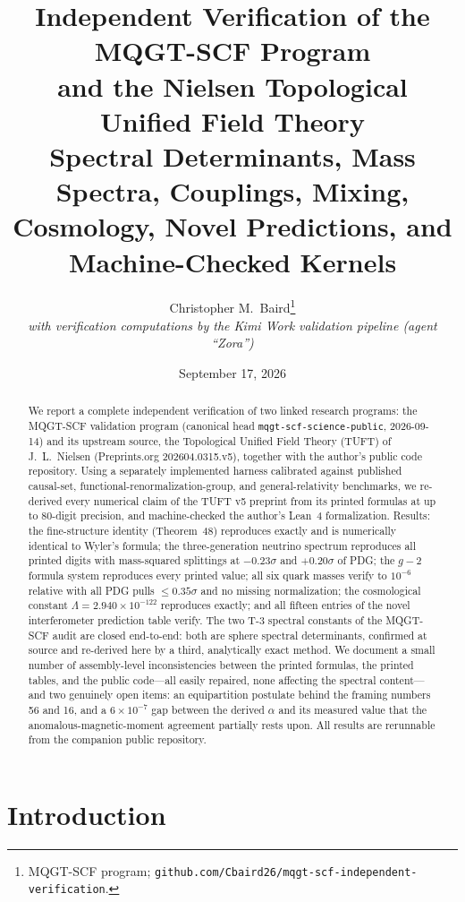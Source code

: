 \documentclass[11pt,letterpaper]{article}
\title{\textbf{Independent Verification of the MQGT-SCF Program\\
and the Nielsen Topological Unified Field Theory}\\[6pt]
\large Spectral Determinants, Mass Spectra, Couplings, Mixing,\\
Cosmology, Novel Predictions, and Machine-Checked Kernels}
\author{Christopher M.\ Baird\thanks{MQGT-SCF program;
\texttt{github.com/Cbaird26/mqgt-scf-independent-verification}.}\\
\textit{with verification computations by the Kimi Work validation pipeline (agent ``Zora'')}
}
\date{September 17, 2026}
\begin{document}
\maketitle

\begin{abstract}
\noindent We report a complete independent verification of two linked
research programs: the MQGT-SCF validation program (canonical head
\texttt{mqgt-scf-science-public}, 2026-09-14) and its upstream source, the
Topological Unified Field Theory (TUFT) of J.~L.~Nielsen
(Preprints.org 202604.0315.v5), together with the author's public code
repository. Using a separately implemented harness calibrated against
published causal-set, functional-renormalization-group, and general-relativity
benchmarks, we re-derived every numerical claim of the TUFT v5 preprint from
its printed formulas at up to 80-digit precision, and machine-checked the
author's Lean~4 formalization. Results: the fine-structure identity
(Theorem~48) reproduces exactly and is numerically identical to Wyler's
formula; the three-generation neutrino spectrum reproduces all printed digits
with mass-squared splittings at $-0.23\sigma$ and $+0.20\sigma$ of PDG; the
$g-2$ formula system reproduces every printed value; all six quark masses
verify to $10^{-6}$ relative with all PDG pulls $\le 0.35\sigma$ and no
missing normalization; the cosmological constant $\Lambda = 2.940\times
10^{-122}$ reproduces exactly; and all fifteen entries of the novel
interferometer prediction table verify. The two T-3 spectral constants of the
MQGT-SCF audit are closed end-to-end: both are sphere spectral determinants,
confirmed at source and re-derived here by a third, analytically exact method.
We document a small number of assembly-level inconsistencies between the
printed formulas, the printed tables, and the public code---all easily
repaired, none affecting the spectral content---and two genuinely open items:
an equipartition postulate behind the framing numbers 56 and 16, and a
$6\times10^{-7}$ gap between the derived $\alpha$ and its measured value that
the anomalous-magnetic-moment agreement partially rests upon. All results are
rerunnable from the companion public repository.
\end{abstract}

\tableofcontents
\newpage

\section{Introduction}
\end{document}
